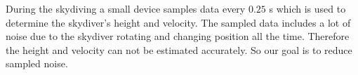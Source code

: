 During the skydiving a small device samples data every $0.25$ s which is used to determine the skydiver's height and velocity. The sampled data includes a lot of noise due to the skydiver rotating and changing position all the time. Therefore the height and velocity can not be estimated accurately. So our goal is to reduce sampled noise. 
